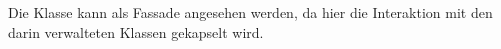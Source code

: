 









Die Klasse  kann als Fassade angesehen werden, da hier die Interaktion mit den darin verwalteten Klassen gekapselt wird.

